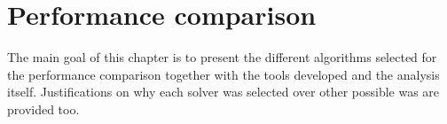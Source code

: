 \chapter{Performance comparison}

The main goal of this chapter is to present the different algorithms selected
for the performance comparison together with the tools developed and the
analysis itself. Justifications on why each solver was selected over other
possible was are provided too.


